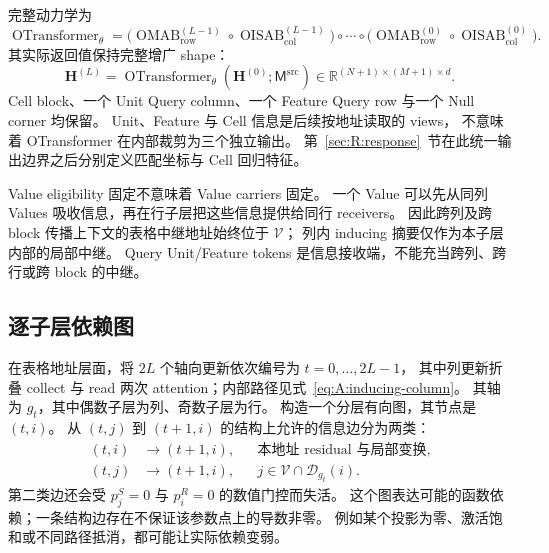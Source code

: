 \documentclass[11pt,UTF8,fontset=fandol]{ctexart}
\numberwithin{equation}{section}
\theoremstyle{definition}
\newcommand{\Vset}{\mathcal V}
\newcommand{\Dset}{\mathcal D}
\newcommand{\R}{\mathbb R}
\newcommand{\OMAB}{\operatorname{OMAB}}
\newcommand{\OTransformer}{\operatorname{OTransformer}}
\begin{document}
完整动力学为
\begin{equation}
  \OTransformer_\theta
   =\bigl(\OMAB_{\mathrm{row}}^{(L-1)}
         \circ\operatorname{OISAB}_{\mathrm{col}}^{(L-1)}\bigr)
      \circ\cdots\circ
     \bigl(\OMAB_{\mathrm{row}}^{(0)}
         \circ\operatorname{OISAB}_{\mathrm{col}}^{(0)}\bigr).
  \label{eq:A:composition}
\end{equation}
其实际返回值保持完整增广 shape：
\begin{equation}
  \bm H^{(L)}
   =\OTransformer_\theta(\bm H^{(0)};\mathsf M^{\mathrm{src}})
   \in\R^{(N+1)\times(M+1)\times d}.
  \label{eq:A:full-output}
\end{equation}
Cell block、一个 Unit Query column、一个 Feature Query row 与一个 Null corner 均保留。
Unit、Feature 与 Cell 信息是后续按地址读取的 views，
不意味着 OTransformer 在内部裁剪为三个独立输出。
第~\ref{sec:R:response}~节在此统一输出边界之后分别定义匹配坐标与 Cell 回归特征。



Value eligibility 固定不意味着 Value carriers 固定。
一个 Value 可以先从同列 Values 吸收信息，再在行子层把这些信息提供给同行 receivers。
因此跨列及跨 block 传播上下文的表格中继地址始终位于 $\Vset$；
列内 inducing 摘要仅作为本子层内部的局部中继。
Query Unit/Feature tokens 是信息接收端，不能充当跨列、跨行或跨 block 的中继。

\subsection{逐子层依赖图}
\label{subsec:A:dependency-graph}

在表格地址层面，将 $2L$ 个轴向更新依次编号为 $t=0,\ldots,2L-1$，
其中列更新折叠 collect 与 read 两次 attention；内部路径见式~\eqref{eq:A:inducing-column}。
其轴为 $g_t$，其中偶数子层为列、奇数子层为行。
构造一个分层有向图，其节点是 $(t,i)$。
从 $(t,j)$ 到 $(t+1,i)$ 的结构上允许的信息边分为两类：
\begin{equation}
 \begin{aligned}
  (t,i)&\longrightarrow(t+1,i),
       &&\text{本地址 residual 与局部变换},\\
  (t,j)&\longrightarrow(t+1,i),
       &&j\in\Vset\cap\Dset_{g_t}(i).
 \end{aligned}
 \label{eq:A:dependency-edges}
\end{equation}
第二类边还会受 $p_j^S=0$ 与 $p_i^R=0$ 的数值门控而失活。
这个图表达可能的函数依赖；一条结构边存在不保证该参数点上的导数非零。
例如某个投影为零、激活饱和或不同路径抵消，都可能让实际依赖变弱。
\end{document}
